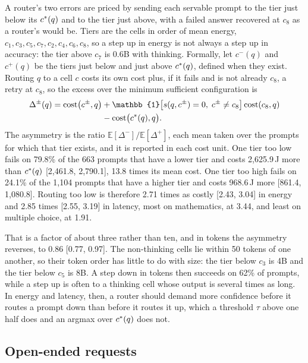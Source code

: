 A router's two errors are priced by sending each servable prompt to the tier
just below its $c^{*}(q)$ and to the tier just above, with a failed answer
recovered at $c_8$ as a router's would be. Tiers are the cells in order of
mean energy, $c_1, c_3, c_5, c_7, c_2, c_4, c_6, c_8$, so a step up in energy
is not always a step up in accuracy: the tier above $c_7$ is 0.6B with
thinking. Formally, let $c^{-}(q)$ and $c^{+}(q)$ be the tiers just below and
just above $c^{*}(q)$, defined when they exist. Routing $q$ to a cell $c$
costs its own cost plus, if it fails and is not already $c_8$, a retry at
$c_8$, so the excess over the minimum sufficient configuration is
\begin{equation}
  \begin{split}
    \Delta^{\pm}(q) = \cost\bigl(c^{\pm}, q\bigr)
    &+ \mathbb{1}\bigl[s(q, c^{\pm}) = 0,\; c^{\pm} \neq c_8\bigr]\,
      \cost(c_8, q)\\
    &- \cost\bigl(\cstar(q), q\bigr).
  \end{split}
  \label{eq:asym}
\end{equation}
The asymmetry is the ratio $\mathbb{E}[\Delta^{-}] / \mathbb{E}[\Delta^{+}]$,
each mean taken over the prompts for which that tier exists, and it is
reported in each cost unit. One tier too low fails on 79.8\% of the 663 prompts that have a
lower tier and costs 2{,}625.9\,J more than $c^{*}(q)$ [2{,}461.8,
2{,}790.1], 13.8 times its mean cost. One tier too high fails on 24.1\% of
the 1{,}104 prompts that have a higher tier and costs 968.6\,J more [861.4,
1{,}080.8]. Routing too low is therefore 2.71 times as costly [2.43, 3.04] in
energy and 2.85 times [2.55, 3.19] in latency, most on mathematics, at 3.44,
and least on multiple choice, at 1.91.

That is a factor of about three rather than ten, and in tokens the asymmetry
reverses, to 0.86 [0.77, 0.97]. The non-thinking cells lie within 50 tokens
of one another, so their token order has little to do with size: the tier
below $c_3$ is 4B and the tier below $c_5$ is 8B. A step down in tokens then
succeeds on 62\% of prompts, while a step up is often to a thinking cell
whose output is several times as long. In energy and latency, then, a router
should demand more confidence before it routes a prompt down than before it
routes it up, which a threshold $\tau$ above one half does and an argmax over
$c^{*}(q)$ does not.

\subsection{Open-ended requests}
\label{sec:results-open}

